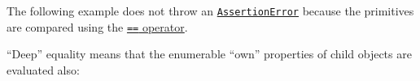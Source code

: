 The following example does not throw an
\hyperref[class-assertassertionerror]{\texttt{AssertionError}} because
the primitives are compared using the
\href{https://developer.mozilla.org/en-US/docs/Web/JavaScript/Reference/Operators/Equality}{\texttt{==}
operator}.

\begin{Shaded}
\begin{Highlighting}[]
 \OperatorTok{;}
\CommentTok{// }

\NormalTok{(}\StringTok{\textquotesingle{}+00000000\textquotesingle{}}\OperatorTok{,} \NormalTok{)}\OperatorTok{;}
\end{Highlighting}
\end{Shaded}

\begin{Shaded}
\begin{Highlighting}[]
\OperatorTok{=} \NormalTok{(}\NormalTok{)}\OperatorTok{;}
\CommentTok{// }

\NormalTok{(}\StringTok{\textquotesingle{}+00000000\textquotesingle{}}\OperatorTok{,} \NormalTok{)}\OperatorTok{;}
\end{Highlighting}
\end{Shaded}

``Deep'' equality means that the enumerable ``own'' properties of child
objects are evaluated also:

